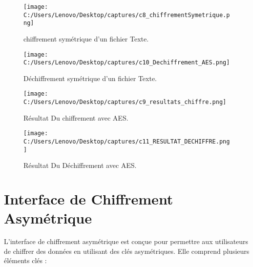 \documentclass[a4paper,12pt]{report}
\begin{document}
 \begin{figure}[h!]
 	\centering
 	\texttt{[image: C:/Users/Lenovo/Desktop/captures/c8\_chiffrementSymetrique.png]}
 	\caption{ chiffrement symétrique d'un fichier Texte.}
 \end{figure}
 
 	\begin{figure}[h!]
 	\centering
 	\texttt{[image: C:/Users/Lenovo/Desktop/captures/c10\_Dechiffrement\_AES.png]}
 	\caption{Déchiffrement symétrique d'un fichier Texte.}
 \end{figure}
 
 \begin{figure}[h!]
 	\centering
 	\texttt{[image: C:/Users/Lenovo/Desktop/captures/c9\_resultats\_chiffre.png]}
 	\caption{Résultat Du chiffrement avec AES.}
 \end{figure}
 
 \begin{figure}[h!]
 	\centering
 	\texttt{[image: C:/Users/Lenovo/Desktop/captures/c11\_RESULTAT\_DECHIFFRE.png]}
 	\caption{Résultat Du Déchiffrement avec AES.}
 \end{figure}

 \clearpage
\section{Interface de Chiffrement Asymétrique}

L'interface de chiffrement asymétrique est conçue pour permettre aux utilisateurs de chiffrer des données en utilisant des clés asymétriques. Elle comprend plusieurs éléments clés :
\end{document}
